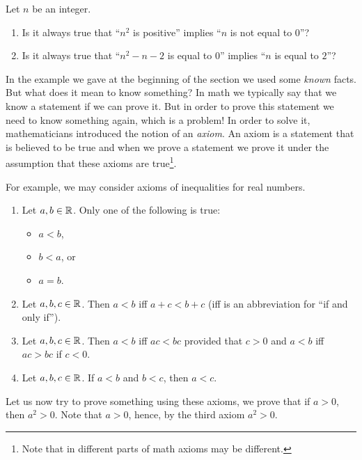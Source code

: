 \begin{exercise}
  Let $n$ be an integer.
  \begin{enumerate}
    \item Is it always true that ``$n^2$ is positive''
      implies ``$n$ is not equal to $0$''?
    \item Is it always true that ``$n^2 - n - 2$ is equal to $0$'' implies
      ``$n$ is equal to $2$''?
  \end{enumerate}
\end{exercise}
In the example we gave at the beginning of the section we used some
\emph{known} facts. But what does it mean to know something? In math we
typically say that we know a statement if we can prove it. But in order to prove
this statement we need to know something again, which is a problem! In order to
solve it, mathematicians introduced the notion of an \emph{axiom}.
An axiom is a statement that is believed to be true and when we prove a statement
we prove it under the assumption that these axioms are true\footnote{Note that
in different parts of math axioms may be different.}.

For example, we may consider axioms of inequalities for real numbers.
\begin{enumerate}
  \item Let $a, b \in \mathbb{R}$. Only one of the following is true:
    \begin{itemize}
      \item $a < b$,
      \item $b < a$, or
      \item $a = b$.
    \end{itemize}
  \item Let $a, b, c \in \mathbb{R}$. Then $a < b$ iff $a + c < b + c$ (iff is an
    abbreviation for ``if and only if'').
  \item Let $a, b, c \in \mathbb{R}$. Then $a < b$ iff $ac < bc$ provided
    that $c > 0$ and $a < b$ iff $ac > bc$ if $c < 0$.
  \item Let $a, b, c \in \mathbb{R}$. If $a < b$ and $b < c$, then $a < c$.
\end{enumerate}



Let us now try to prove something using these axioms, we prove that if $a > 0$,
then $a^2 > 0$. Note that $a > 0$, hence, by the third axiom $a^2 > 0$.

